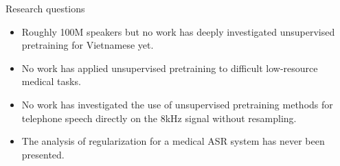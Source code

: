 \begin{frame}{Research questions}

\begin{itemize}
    \item Roughly 100M speakers but no work has deeply investigated unsupervised pretraining for Vietnamese yet. 
    \item No work has applied unsupervised pretraining to difficult low-resource medical tasks.
    \item No work has investigated the use of unsupervised pretraining methods for telephone speech directly on the 8kHz signal without resampling.
    \item The analysis of regularization for a medical ASR system has never been presented.
\end{itemize}

\end{frame}

